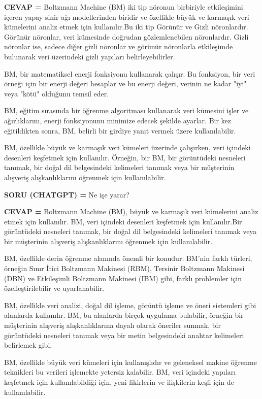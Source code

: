 \documentclass[11pt]{article}
\begin{document}
\textbf{CEVAP =} Boltzmann Machine (BM) iki tip nöronun birbiriyle etkileşimini içeren yapay sinir ağı modellerinden biridir ve özellikle büyük ve karmaşık veri kümelerini analiz etmek için kullanılır.Bu iki tip Görünür ve Gizli nöronlardır. Görünür nöronlar, veri kümesinde doğrudan gözlemlenebilen nöronlardır. Gizli nöronlar ise, sadece diğer gizli nöronlar ve görünür nöronlarla etkileşimde bulunarak veri üzerindeki gizli yapıları belirleyebilirler.

 BM, bir matematiksel enerji fonksiyonu kullanarak çalışır. Bu fonksiyon, bir veri örneği için bir enerji değeri hesaplar ve bu enerji değeri, verinin ne kadar "iyi" veya "kötü" olduğunu temsil eder.
 
 BM, eğitim sırasında bir öğrenme algoritması kullanarak veri kümesini işler ve ağırlıklarını, enerji fonksiyonunu minimize edecek şekilde ayarlar. Bir kez eğitildikten sonra, BM, belirli bir girdiye yanıt vermek üzere kullanılabilir.

BM, özellikle büyük ve karmaşık veri kümeleri üzerinde çalışırken, veri içindeki desenleri keşfetmek için kullanılır. Örneğin, bir BM, bir görüntüdeki nesneleri tanımak, bir doğal dil belgesindeki kelimeleri tanımak veya bir müşterinin alışveriş alışkanlıklarını öğrenmek için kullanılabilir.

\textbf{SORU (CHATGPT) =} Ne işe yarar?

\textbf{CEVAP =} Boltzmann Machine (BM), büyük ve karmaşık veri kümelerini analiz etmek için kullanılır. BM, veri içindeki desenleri keşfetmek için kullanılır.Bir görüntüdeki nesneleri tanımak, bir doğal dil belgesindeki kelimeleri tanımak veya bir müşterinin alışveriş alışkanlıklarını öğrenmek için kullanılabilir.

BM, özellikle derin öğrenme alanında önemli bir konudur. BM'nin farklı türleri, örneğin Sınır İtici Boltzmann Makinesi (RBM), Tersinir Boltzmann Makinesi (DBN) ve Etkileşimli Boltzmann Makinesi (IBM) gibi, farklı problemler için özelleştirilebilir ve uyarlanabilir.

BM, özellikle veri analizi, doğal dil işleme, görüntü işleme ve öneri sistemleri gibi alanlarda kullanılır. BM, bu alanlarda birçok uygulama bulabilir, örneğin bir müşterinin alışveriş alışkanlıklarına dayalı olarak öneriler sunmak, bir görüntüdeki nesneleri tanımak veya bir metin belgesindeki anahtar kelimeleri belirlemek gibi.

BM, özellikle büyük veri kümeleri için kullanışlıdır ve geleneksel makine öğrenme teknikleri bu verileri işlemekte yetersiz kalabilir. BM, veri içindeki yapıları keşfetmek için kullanılabildiği için, yeni fikirlerin ve ilişkilerin keşfi için de kullanılabilir.
\end{document}
